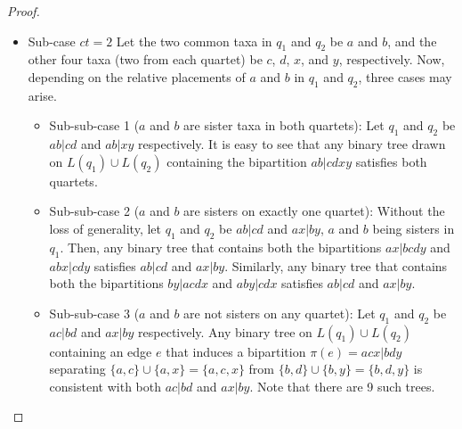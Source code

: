 \documentclass[10pt,a4paper]{article}
\newcommand{\addb}[1]{{\color{red} #1}}
\begin{document}
\begin{proof}
\begin{itemize}
\begin{itemize}
    \item Sub-case $ct = 2$ Let the two common taxa in $q_1$ and $q_2$ be $a$ and $b$, and the other four taxa (two from each quartet) be $c$, $d$, $x$, and $y$, respectively. Now, depending on the relative placements of $a$ and $b$ in $q_1$ and $q_2$, three cases may arise.
\begin{itemize}
    \item Sub-sub-case 1 ($a$ and $b$ are sister taxa in both quartets): Let $q_1$ and $q_2$ be $ab|cd$ and $ab|xy$ respectively. It is easy to see that any binary tree drawn on $L(q_1) \cup L(q_2)$ containing the bipartition $ab|cdxy$ satisfies both quartets.
    \item Sub-sub-case 2 ($a$ and $b$ are sisters on exactly one quartet): Without the loss of generality, let $q_1$ and $q_2$ be $ab|cd$ and $ax|by$, $a$ and $b$ being sisters in $q_1$. Then, any binary tree that contains both the bipartitions $ax|bcdy$ and $abx|cdy$ satisfies $ab|cd$ and $ax|by$. Similarly, any binary tree that contains both the bipartitions $by|acdx$ and $aby|cdx$ satisfies $ab|cd$ and $ax|by$. 
    
    
    \item Sub-sub-case 3 ($a$ and $b$ are not sisters on any quartet): Let $q_1$ and $q_2$ be $ac|bd$ and $ax|by$ respectively. Any binary tree on $L(q_1) \cup L(q_2)$ containing an edge $e$ that induces a bipartition $\pi(e) = acx|bdy$ separating $\{a,c\} \cup \{a,x\} = \{a,c,x\}$ from $\{b,d\} \cup \{b,y\} = \{b,d,y\}$ is consistent with both $ac|bd$ and $ax|by$. Note that there are \addb{9} such trees. 
    

    
    

\end{itemize}
\end{itemize}
\end{itemize}
\end{proof}
\end{document}
